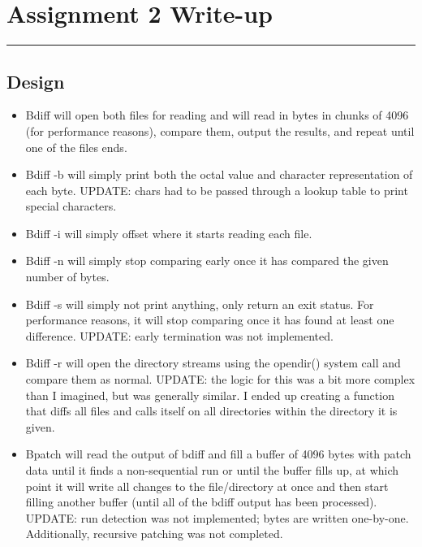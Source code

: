 \documentclass[letterpaper,10pt,fleqn]{article}
\numberwithin{equation}{section}
\begin{document}

\section*{Assignment 2 Write-up}
\hrule

\subsection*{Design}
\begin{itemize}
    \item Bdiff will open both files for reading and will read in bytes in chunks of 4096 (for performance reasons), compare them, output the results, and repeat until one of the files ends.
    \item Bdiff -b will simply print both the octal value and character representation of each byte.  UPDATE: chars had to be passed through a lookup table to print special characters.
    \item Bdiff -i will simply offset where it starts reading each file.
    \item Bdiff -n will simply stop comparing early once it has compared the given number of bytes.
    \item Bdiff -s will simply not print anything, only return an exit status.  For performance reasons, it will stop comparing once it has found at least one difference.  UPDATE: early termination was not implemented.
    \item Bdiff -r will open the directory streams using the opendir() system call and compare them as normal.  UPDATE: the logic for this was a bit more complex than I imagined, but was generally similar.  I ended up creating a function that diffs all files and calls itself on all directories within the directory it is given.
    \item Bpatch will read the output of bdiff and fill a buffer of 4096 bytes with patch data until it finds a non-sequential run or until the buffer fills up, at which point it will write all changes to the file/directory at once and then start filling another buffer (until all of the bdiff output has been processed). UPDATE: run detection was not implemented; bytes are written one-by-one.  Additionally, recursive patching was not completed.
\end{itemize}
\end{document}
